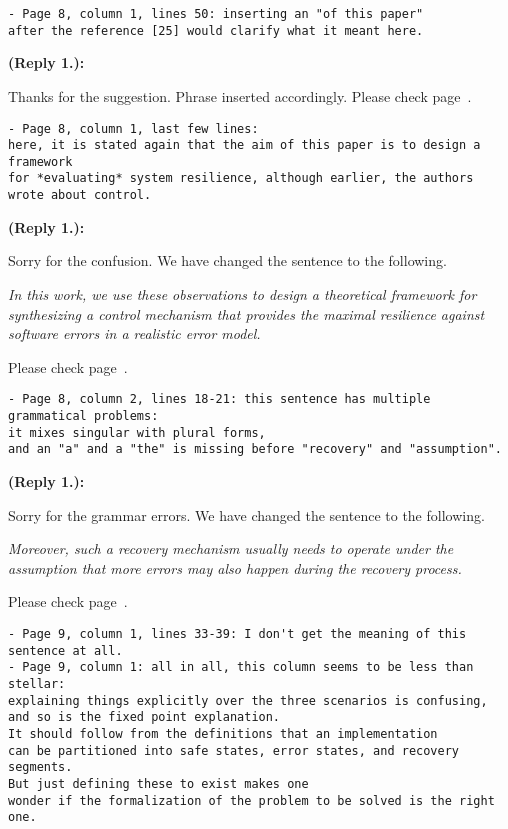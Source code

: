 \documentclass[times,10pt,twocolumn]{article}
\newcounter{cabbage0}
\newcounter{cabbage1}
\newcounter{cabbage2}
\newcounter{cabbage3}
\newcounter{bean0}
\newcounter{bean1}
\newcounter{bean2}
\newcounter{bean3}
\newcounter{bean4}
\newcounter{bean5}
\newcounter{bean6}
\newenvironment{reply1}{\begin{list}{\bf (Reply 1.\arabic{bean1}):} 
        {\usecounter{bean1}\setcounter{bean1}{\value{cabbage1}} \item \setcounter{cabbage1}{\value{bean1}} 
        }
}{\end{list}}
\begin{document}
\begin{verbatim} 
- Page 8, column 1, lines 50: inserting an "of this paper" 
after the reference [25] would clarify what it meant here.
\end{verbatim} 
\begin{reply1} 
Thanks for the suggestion. 
Phrase inserted accordingly. 
Please check page~\pageref{reply1.of.this.paper}.  
\end{reply1} 
\begin{verbatim} 
- Page 8, column 1, last few lines: 
here, it is stated again that the aim of this paper is to design a framework 
for *evaluating* system resilience, although earlier, the authors 
wrote about control.
\end{verbatim} 
\begin{reply1} 
Sorry for the confusion. 
We have changed the sentence to the following. 
\begin{center} 
\parbox{140mm}{\em 
In this work, we use these observations to design a theoretical framework for synthesizing a control mechanism that provides 
the maximal resilience against software errors in a realistic error model. 
} 
\end{center} 
Please check page~\pageref{reply1.theoretical.framework.eval}.  
\end{reply1} 
\begin{verbatim} 
- Page 8, column 2, lines 18-21: this sentence has multiple grammatical problems: 
it mixes singular with plural forms, 
and an "a" and a "the" is missing before "recovery" and "assumption".
\end{verbatim} 
\begin{reply1} 
Sorry for the grammar errors. 
We have changed the sentence to the following. 
\begin{center} 
\parbox{140mm}{\em 
Moreover, such a recovery mechanism usually needs to operate under the assumption 
that more errors may also happen during the recovery process.  
} 
\end{center} 
Please check page~\pageref{reply1.a.recovery.the.assumption}.  
\end{reply1} 
\begin{verbatim} 
- Page 9, column 1, lines 33-39: I don't get the meaning of this sentence at all.
- Page 9, column 1: all in all, this column seems to be less than stellar: 
explaining things explicitly over the three scenarios is confusing, 
and so is the fixed point explanation. 
It should follow from the definitions that an implementation 
can be partitioned into safe states, error states, and recovery segments. 
But just defining these to exist makes one 
wonder if the formalization of the problem to be solved is the right one.
\end{verbatim}
\end{document}
